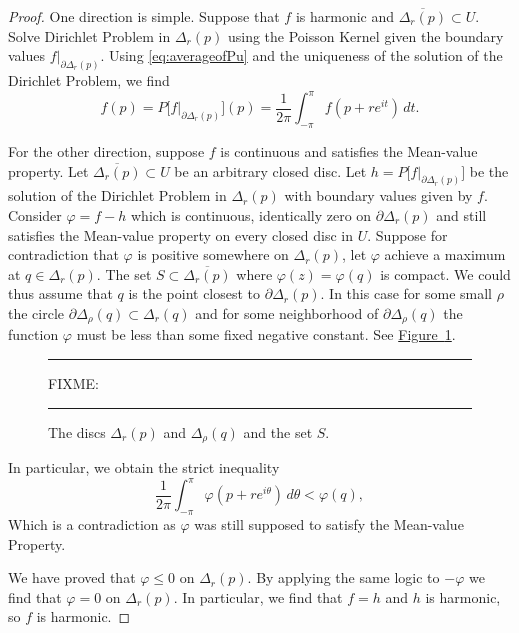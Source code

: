 \documentclass[12pt,openany]{book}
\theoremstyle{plain}
\theoremstyle{remark}
\theoremstyle{definition}
\newenvironment{myfig}{%
\begin{figure}[h!t]
\noindent\rule{\textwidth}{0.4pt}\vspace{12pt}\par\centering}%
{\par\noindent\rule{\textwidth}{0.4pt}
\end{figure}}
\theoremstyle{exercise}
\theoremstyle{example}
\newcommand{\figureref}[1]{\hyperref[#1]{Figure~\ref*{#1}}}
\begin{document}
\begin{proof}
One direction is simple.  Suppose that $f$ is harmonic and
$\overline{\Delta_r(p)} \subset U$.  Solve
Dirichlet Problem in $\Delta_r(p)$ using the Poisson Kernel
given the boundary values
$f|_{\partial \Delta_r(p)}$.  Using \eqref{eq:averageofPu} and the
uniqueness of the solution of the Dirichlet Problem, we find
\begin{equation*}
f(p) = P\bigl[f|_{\partial \Delta_r(p)}\big](p) =
\frac{1}{2\pi} \int_{-\pi}^{\pi}f(p + r e^{it}) \, dt .
\end{equation*}

For the other direction, suppose $f$ is continuous and satisfies the
Mean-value property.  Let $\overline{\Delta_r(p)} \subset U$ be an
arbitrary closed disc.  Let $h = P\bigl[f|_{\partial \Delta_r(p)}\big]$
be the solution of the Dirichlet Problem in $\Delta_r(p)$ with boundary
values given by $f$.  Consider $\varphi = f-h$ which is continuous, identically zero
on $\partial \Delta_r(p)$ and still satisfies the Mean-value property
on every closed disc in $U$.  Suppose for contradiction that $\varphi$ is positive
somewhere on $\Delta_r(p)$, let $\varphi$ achieve a maximum at $q \in
\Delta_r(p)$.
The set $S \subset \overline{\Delta_r(p)}$ where $\varphi(z) = \varphi(q)$ is compact.
We could thus assume that $q$ is the point closest to
$\partial \Delta_r(p)$.  In this case for some small $\rho$ the circle
$\partial \Delta_\rho(q) \subset \Delta_r(q)$ and for some neighborhood
of $\partial \Delta_\rho(q)$ the function $\varphi$ must be less than some fixed
negative constant.  See \figureref{fig:meanvalue}.

\begin{myfig}
FIXME:
\caption{The discs $\Delta_r(p)$ and $\Delta_\rho(q)$ and the set
$S$.\label{fig:meanvalue}}
\end{myfig}

In particular, we obtain the strict inequality
\begin{equation*}
\frac{1}{2\pi} \int_{-\pi}^{\pi} \varphi(p+re^{i\theta})\, d\theta <
\varphi(q) ,
\end{equation*}
Which is a contradiction as $\varphi$ was still supposed to satisfy the
Mean-value Property.

We have proved that $\varphi \leq 0$ on $\Delta_r(p)$.  By applying the same
logic to $-\varphi$ we find that $\varphi = 0$ on $\Delta_r(p)$.  In
particular, we find that $f=h$ and $h$ is harmonic, so $f$ is harmonic.
\end{proof}
\end{document}
